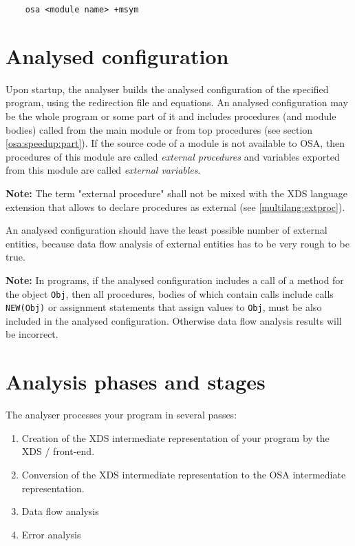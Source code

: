 \verb'    osa <module name> +msym'


\section{Analysed configuration}
\label{osa:anconf}

Upon startup, the analyser builds the analysed configuration of the 
specified program, using the redirection file and  equations.
An analysed configuration may be the whole program or some part of it
and includes procedures (and module bodies) called from the main module 
or from top procedures (see section \ref{osa:speedup:part}). 
If the source code of a module is not available to OSA, then procedures
of this module are called {\em external procedures} and variables
exported from this module are called {\em external variables}.

{\bf Note:} The term "external procedure" shall not be mixed with
the XDS language extension that allows to declare procedures as external
(see \ref{multilang:extproc}).

An analysed configuration should have the least possible number of external
entities, because data flow analysis of external entities has to be
very rough to be true.

{\bf Note:} In \ot{} programs, if the analysed configuration includes a 
call of a method for the object \verb'Obj', then all procedures, 
bodies of which contain calls include calls \verb'NEW(Obj)' or 
assignment statements that assign values to \verb'Obj', must be 
also included in the analysed configuration. 
Otherwise data flow analysis results will be incorrect.


\section{Analysis phases and stages}
\label{osa:phases}

The analyser processes your program in several passes: 

\begin{enumerate}
\item Creation of the XDS intermediate representation
      of your program by the XDS \mt{}/\ot{} front-end.
\item Conversion of the XDS intermediate representation to the OSA 
      intermediate representation.
\item Data flow analysis
\item Error analysis
\end{enumerate}

